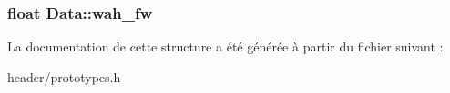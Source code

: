 \subsubsection[{\texorpdfstring{wah\+\_\+fw}{wah_fw}}]{\setlength{\rightskip}{0pt plus 5cm}float Data\+::wah\+\_\+fw}\hypertarget{structData_a5755f20c0c466ee6f8c2ef48234b83ba}{}\label{structData_a5755f20c0c466ee6f8c2ef48234b83ba}


La documentation de cette structure a été générée à partir du fichier suivant \+:\begin{DoxyCompactItemize}
\item 
header/prototypes.\+h\end{DoxyCompactItemize}
